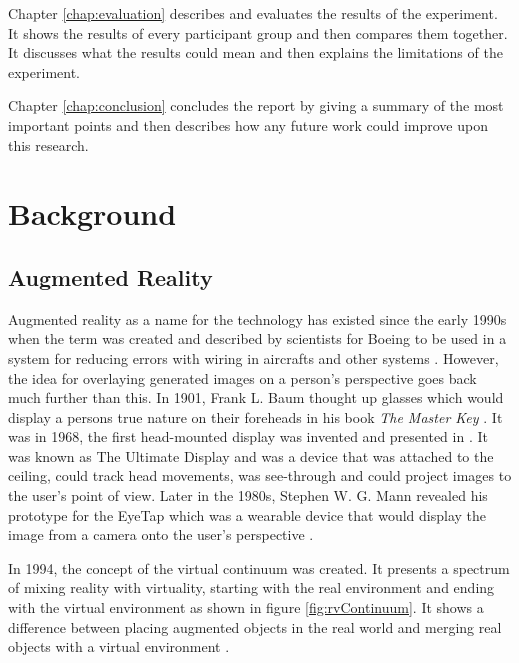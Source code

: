 \documentclass{l4proj}
\begin{document}
Chapter \ref{chap:evaluation} describes and evaluates the results of the experiment. It shows the results of every participant group and then compares them together. It discusses what the results could mean and then explains the limitations of the experiment.

Chapter \ref{chap:conclusion} concludes the report by giving a summary of the most important points and then describes how any future work could improve upon this research.

\chapter{Background}
\label{chap:background}

\section{Augmented Reality}

Augmented reality as a name for the technology has existed since the early 1990s when the term was created and described by scientists for Boeing to be used in a system for reducing errors with wiring in aircrafts and other systems \citep{caudell1992augmented}. However, the idea for overlaying generated images on a person's perspective goes back much further than this. In 1901, Frank L. Baum thought up glasses which would display a persons true nature on their foreheads in his book \textit{The Master Key} \citep{vertucci_history_2023}. It was in 1968, the first head-mounted display was invented and presented in \citet{sutherland1965ultimate}. It was known as The Ultimate Display and was a device that was attached to the ceiling, could track head movements, was see-through and could project images to the user's point of view. Later in the 1980s, Stephen W. G. Mann revealed his prototype for the EyeTap which was a wearable device that would display the image from a camera onto the user's perspective \citep{vertucci_history_2023}.

In 1994, the concept of the virtual continuum was created. It presents a spectrum of mixing reality with virtuality, starting with the real environment and ending with the virtual environment as shown in figure \ref{fig:rvContinuum}. It shows a difference between placing augmented objects in the real world and merging real objects with a virtual environment \citep{milgram1994taxonomy}.
\end{document}
